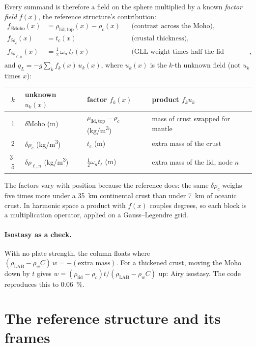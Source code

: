 Every summand is therefore a field on the sphere multiplied by a known \emph{factor field} $f(x)$, the reference structure's contribution:
\begin{align*}
    f_{\delta\mathrm{Moho}}(x) &= \rho_{\mathrm{lid,top}}(x) - \rho_c(x) && \text{(contrast across the Moho)},\\
    f_{\delta\rho_c}(x) &= t_c(x) && \text{(crustal thickness)},\\
    f_{\delta\rho_{\ell,n}}(x) &= \tfrac12\,\omega_n\,t_\ell(x) && \text{(GLL weight times half the lid thickness)},
\end{align*}
and $q_L = -g\sum_k f_k(x)\,u_k(x)$, where $u_k(x)$ is the $k$-th unknown field (not $u_k$ times $x$):
\begin{center}
\small
\begin{tabular}{clll}
\toprule
$k$ & unknown $u_k(x)$ & factor $f_k(x)$ & product $f_k u_k$\\
\midrule
1 & $\delta\mathrm{Moho}$ (m) & $\rho_{\mathrm{lid,top}}-\rho_c$ (\si{kg/m^3}) & mass of crust swapped for mantle\\
2 & $\delta\rho_c$ (\si{kg/m^3}) & $t_c$ (m) & extra mass of the crust\\
3--5 & $\delta\rho_{\ell,n}$ (\si{kg/m^3}) & $\tfrac12\omega_n t_\ell$ (m) & extra mass of the lid, node $n$\\
\bottomrule
\end{tabular}
\end{center}
The factors vary with position because the reference does: the same $\delta\rho_c$ weighs five times more under a \qty{35}{km} continental crust than under \qty{7}{km} of oceanic crust.
In harmonic space a product with $f(x)$ couples degrees, so each block is a multiplication operator, applied on a Gauss--Legendre grid.

\paragraph{Isostasy as a check.}
With no plate strength, the column floats where $(\rho_{\mathrm{LAB}}-\rho_w C)\,w = -(\text{extra mass})$.
For a thickened crust, moving the Moho down by $t$ gives $w = (\rho_{\mathrm{lid}}-\rho_c)t/(\rho_{\mathrm{LAB}}-\rho_w C)$ up: Airy isostasy.
The code reproduces this to \qty{0.06}{\percent}.

\section{The reference structure and its frames}

